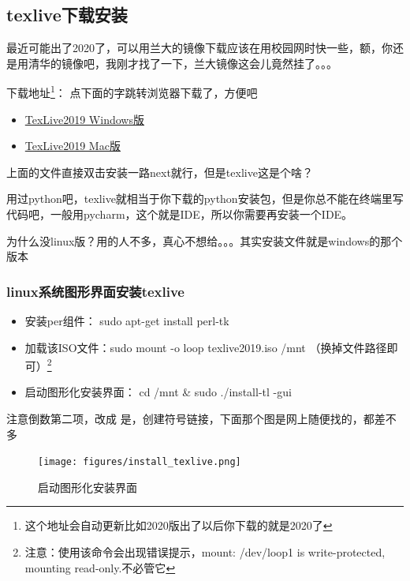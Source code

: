 \documentclass[AutoFakeBold]{LZUThesis2007}
\begin{document}
\subsection{texlive下载安装}
最近可能出了2020了，可以用兰大的镜像下载应该在用校园网时快一些，额，你还是用清华的镜像吧，我刚才找了一下，兰大镜像这会儿竟然挂了。。。

下载地址\footnote{这个地址会自动更新比如2020版出了以后你下载的就是2020了}： 点下面的字跳转浏览器下载了，方便吧

\begin{itemize}
	\item \href{https://mirrors.tuna.tsinghua.edu.cn/CTAN/systems/texlive/Images/texlive.iso}{TexLive2019 \quad Windows版}
	\item \href{http://tug.org/cgi-bin/mactex-download/MacTeX.pkg}{TexLive2019 \quad Mac版}
\end{itemize}

上面的文件直接双击安装一路next就行，但是texlive这是个啥？

用过python吧，texlive就相当于你下载的python安装包，但是你总不能在终端里写代码吧，一般用pycharm，这个就是IDE，所以你需要再安装一个IDE。


为什么没linux版？用的人不多，真心不想给。。。其实安装文件就是windows的那个版本

\subsubsection{linux系统图形界面安装texlive} %
\label{ssub:linux图形界面安装方式}

\begin{itemize}
	\item[1. ] 安装per组件： sudo apt-get install perl-tk
	\item[2. ] 加载该ISO文件：sudo mount -o loop texlive2019.iso /mnt （换掉文件路径即可）\footnote{注意：使用该命令会出现错误提示，mount: /dev/loop1 is write-protected, mounting read-only.不必管它}
	\item[3. ]启动图形化安装界面： cd /mnt \& sudo ./install-tl -gui
\end{itemize}

注意倒数第二项，改成 是，创建符号链接，下面那个图是网上随便找的，都差不多

\begin{figure}[H]
    \centering
    \texttt{[image: figures/install\_texlive.png]}
    \caption{启动图形化安装界面}
    \label{fig_install_texlive}
\end{figure}
\end{document}
